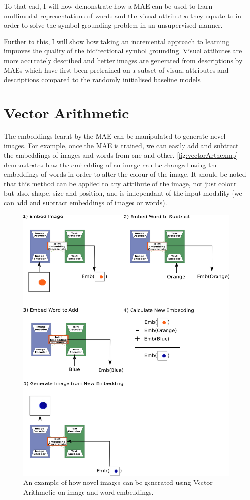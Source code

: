 To that end, I will now demonstrate how a MAE can be used to learn multimodal representations of words and the visual attributes they equate to in order to solve the symbol grounding problem in an unsupervised manner.

Further to this, I will show how taking an incremental approach to learning improves the quality of the bidirectional symbol grounding. Visual attibutes are more accurately described and better images are generated from descriptions by MAEs which have first been pretrained on a subset of visual attributes and descriptions compared to the randomly initialised baseline models.

\section{Vector Arithmetic}
The embeddings learnt by the MAE can be manipulated to generate novel images. For example, once the MAE is trained, we can easily add and subtract the embeddings of images and words from one and other. \autoref{fig:vectorArthexmp} demonstrates how the embedding of an image can be changed using the embeddings of words in order to alter the colour of the image. It should be noted that this method can be applied to any attribute of the image, not just colour but also, shape, size and position, and is independant of the input modality (we can add and subtract embeddings of images or words).

\begin{figure}
\centering
\includegraphics[width=\textwidth]{Figs/shapes/vectorArthExmp.png}
\caption{An example of how novel images can be generated using Vector Arithmetic on image and word embeddings.}
\label{fig:vectorArthexmp}
\end{figure}

